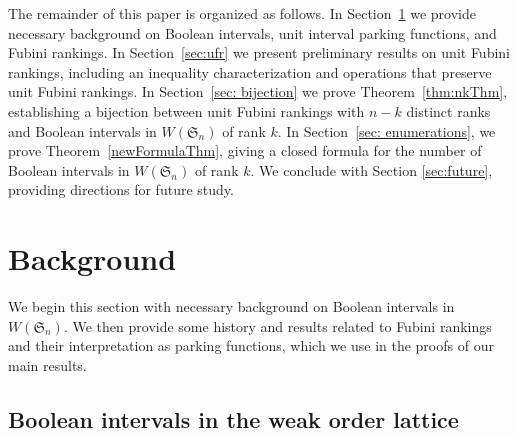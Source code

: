\documentclass[11pt,reqno]{amsart}
\theoremstyle{definition}
\theoremstyle{notation}
\theoremstyle{openproblem}
\newcommand{\Sym}{\mathfrak{S}}
\begin{document}
The remainder of this paper is organized as follows. 
In Section~\ref{sec: background} we provide necessary background on Boolean intervals, unit interval parking functions, and Fubini rankings.
In Section~\ref{sec:ufr} we present preliminary results on unit Fubini rankings, including an inequality characterization and operations that preserve unit Fubini rankings. 
In Section~\ref{sec: bijection} we prove Theorem~\ref{thm:nkThm}, establishing a bijection between unit Fubini rankings with $n-k$ distinct ranks and Boolean intervals in $W(\Sym_n)$ of rank $k$.
In Section~\ref{sec: enumerations}, we prove Theorem~\ref{newFormulaThm}, giving a closed formula for the number of Boolean intervals in $W(\Sym_n)$ of rank $k$.
We conclude with Section \ref{sec:future}, providing directions for future study.



\section{Background}
\label{sec: background}

We begin this section with necessary background on Boolean intervals in $W(\Sym_n)$. 
We then provide some history and results related to Fubini rankings and their interpretation as parking functions, which we use in the proofs of our main results.

\subsection{Boolean intervals in the weak order lattice}
\end{document}
